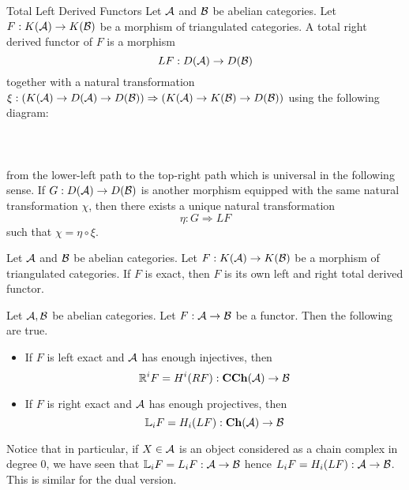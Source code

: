 \documentclass[a4paper]{article}
\begin{document}
\begin{defn}{Total Left Derived Functors}{} Let $\mathcal{A}$ and $\mathcal{B}$ be abelian categories. Let $F:K(\mathcal{A})\to K(\mathcal{B})$ be a morphism of triangulated categories. A total right derived functor of $F$ is a morphism $$LF:D(\mathcal{A})\to D(\mathcal{B})$$ together with a natural transformation $\xi:(K(\mathcal{A})\to D(\mathcal{A})\to D(\mathcal{B}))\Rightarrow(K(\mathcal{A})\to K(\mathcal{B})\to D(\mathcal{B}))$ using the following diagram: \\~\\
\\~\\
from the lower-left path to the top-right path which is universal in the following sense. If $G:D(\mathcal{A})\to D(\mathcal{B})$ is another morphism equipped with the same natural transformation $\chi$, then there exists a unique natural transformation $$\eta:G\Rightarrow LF$$ such that $\chi=\eta\circ\xi$. 
\end{defn}

\begin{lmm}{}{} Let $\mathcal{A}$ and $\mathcal{B}$ be abelian categories. Let $F:K(\mathcal{A})\to K(\mathcal{B})$ be a morphism of triangulated categories. If $F$ is exact, then $F$ is its own left and right total derived functor. 
\end{lmm}

\begin{thm}{}{} Let $\mathcal{A},\mathcal{B}$ be abelian categories. Let $F:\mathcal{A}\to\mathcal{B}$ be a functor. Then the following are true. 
\begin{itemize}
\item If $F$ is left exact and $\mathcal{A}$ has enough injectives, then $$\mathbb{R}^iF=H^i(RF):\bold{CCh}(\mathcal{A})\to\mathcal{B}$$
\item If $F$ is right exact and $\mathcal{A}$ has enough projectives, then $$\mathbb{L}_iF=H_i(LF):\bold{Ch}(\mathcal{A})\to\mathcal{B}$$
\end{itemize}
\end{thm}

Notice that in particular, if $X\in\mathcal{A}$ is an object considered as a chain complex in degree $0$, we have seen that $\mathbb{L}_iF=L_iF:\bold{\mathcal{A}}\to\bold{\mathcal{B}}$ hence $L_iF=H_i(LF):\bold{\mathcal{A}}\to\bold{\mathcal{B}}$. This is similar for the dual version. 
\end{document}
